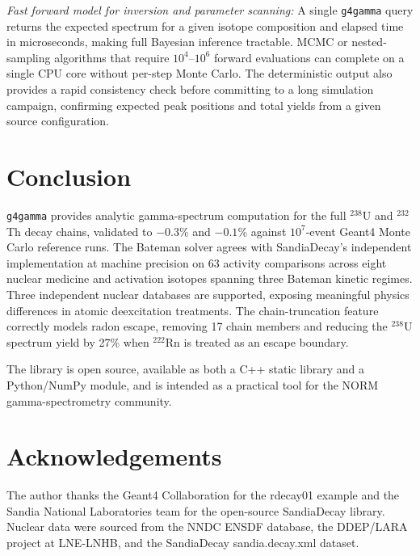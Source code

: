 \documentclass[journal]{IEEEtran}
\begin{document}
\textit{Fast forward model for inversion and parameter scanning:}
A single \texttt{g4gamma} query returns the expected spectrum for a given isotope
composition and elapsed time in microseconds, making full Bayesian inference
tractable.
MCMC or nested-sampling algorithms that require $10^4$--$10^6$ forward evaluations
can complete on a single CPU core without per-step Monte Carlo.
The deterministic output also provides a rapid consistency check before committing
to a long simulation campaign, confirming expected peak positions and total yields
from a given source configuration.

\section{Conclusion}

\texttt{g4gamma} provides analytic gamma-spectrum computation for the full
$^{238}$U and $^{232}$Th decay chains, validated to $-0.3$\% and $-0.1$\%
against $10^7$-event Geant4 Monte Carlo reference runs.
The Bateman solver agrees with SandiaDecay's independent implementation at
machine precision on 63 activity comparisons across eight nuclear medicine and
activation isotopes spanning three Bateman kinetic regimes.
Three independent nuclear databases are supported, exposing meaningful
physics differences in atomic deexcitation treatments.
The chain-truncation feature correctly models radon escape, removing 17 chain
members and reducing the $^{238}$U spectrum yield by 27\% when $^{222}$Rn is
treated as an escape boundary.

The library is open source, available as both a C++ static library and a
Python/NumPy module, and is intended as a practical tool for the NORM
gamma-spectrometry community.

\section*{Acknowledgements}
The author thanks the Geant4 Collaboration for the rdecay01 example and the
Sandia National Laboratories team for the open-source SandiaDecay library.
Nuclear data were sourced from the NNDC ENSDF database, the DDEP/LARA project
at LNE-LNHB, and the SandiaDecay sandia.decay.xml dataset.



\end{document}
